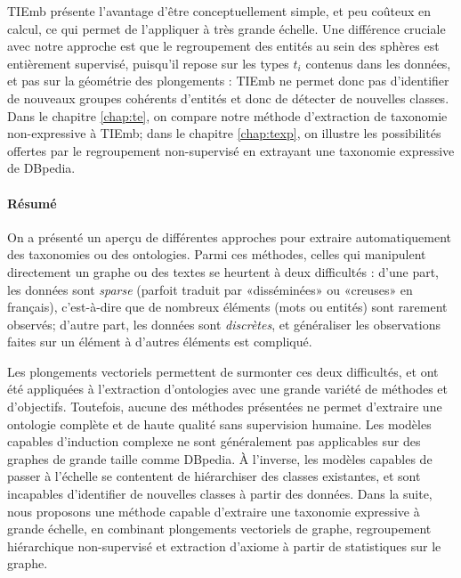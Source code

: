 TIEmb présente l'avantage d'être conceptuellement simple, et peu coûteux en calcul, ce qui permet de l'appliquer à très grande échelle. Une différence cruciale avec notre approche est que le regroupement des entités au sein des sphères est entièrement supervisé, puisqu'il repose sur les types $t_i$ contenus dans les données, et pas sur la géométrie des plongements : TIEmb ne permet donc pas d'identifier de nouveaux groupes cohérents d'entités et donc de détecter de nouvelles classes. Dans le chapitre \ref{chap:te}, on compare notre méthode d'extraction de taxonomie non-expressive à TIEmb; dans le chapitre \ref{chap:texp}, on illustre les possibilités offertes par le regroupement non-supervisé en extrayant une taxonomie expressive de DBpedia.

\paragraph{Résumé}

On a présenté un aperçu de différentes approches pour extraire automatiquement des taxonomies ou des ontologies. Parmi ces méthodes, celles qui manipulent directement un graphe ou des textes se heurtent à deux difficultés : d'une part, les données sont \textit{sparse} (parfoit traduit par «disséminées» ou «creuses» en français), c'est-à-dire que de nombreux éléments (mots ou entités) sont rarement observés; d'autre part, les données sont \textit{discrètes}, et généraliser les observations faites sur un élément à d'autres éléments est compliqué.

Les plongements vectoriels permettent de surmonter ces deux difficultés, et ont été appliquées à l'extraction d'ontologies avec une grande variété de méthodes et d'objectifs.
Toutefois, aucune des méthodes présentées ne permet d'extraire une ontologie complète et de haute qualité sans supervision humaine. %
Les modèles capables d'induction complexe ne sont généralement pas applicables sur des graphes de grande taille comme DBpedia. À l'inverse, les modèles capables de passer à l'échelle se contentent de hiérarchiser des classes existantes, et sont incapables d'identifier de nouvelles classes à partir des données. 
Dans la suite, nous proposons une méthode capable d'extraire une taxonomie expressive à grande échelle, en combinant plongements vectoriels de graphe, regroupement hiérarchique non-supervisé et extraction d'axiome à partir de statistiques sur le graphe.